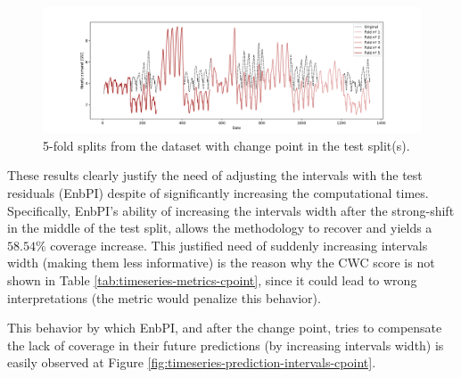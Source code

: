 \begin{figure}[ht]
    \hspace{-12mm}
    \includegraphics[width=1.15\textwidth]{Figures/timeseries/with-change-point/ts-with-change-point-5-folds.png}
    \caption{5-fold splits from the dataset with change point in the test split(s).}
    \label{fig:ts-5-folds-cpoint}
\end{figure}

These results clearly justify the need of adjusting the intervals with the test residuals (EnbPI) despite of significantly increasing the computational times.\\

Specifically, EnbPI's ability of increasing the intervals width after the strong-shift in the middle of the test split, allows the methodology to recover and yields a $58.54\%$ coverage increase. This justified need of suddenly increasing intervals width (making them less informative) is the reason why the CWC score is not shown in Table \ref{tab:timeseries-metrics-cpoint}, since it could lead to wrong interpretations (the metric would penalize this behavior).

This behavior by which EnbPI, and after the change point, tries to compensate the lack of coverage in their future predictions (by increasing intervals width) is easily observed at Figure \ref{fig:timeseries-prediction-intervals-cpoint}.\\

